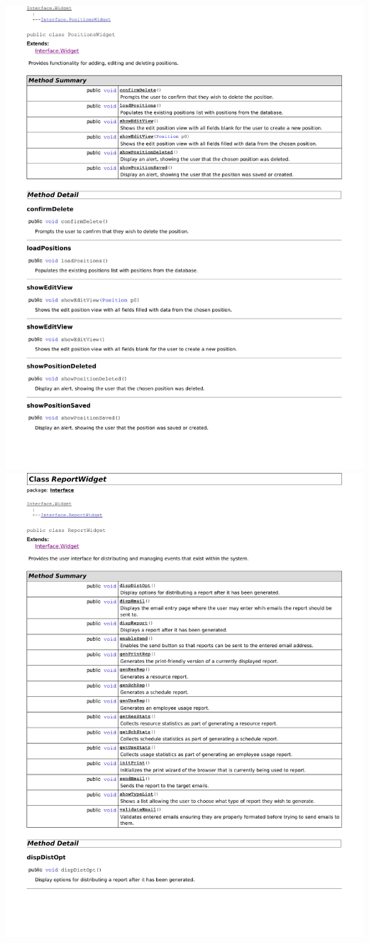 \documentclass[letterpaper,12pt]{report}
\begin{document}
\newpage
\includegraphics[scale=0.9,trim=20mm 30mm 25mm 5mm]{externals/di6.pdf}
\newpage
\includegraphics[scale=0.9,trim=20mm 30mm 25mm 5mm]{externals/di7.pdf}
\end{document}
